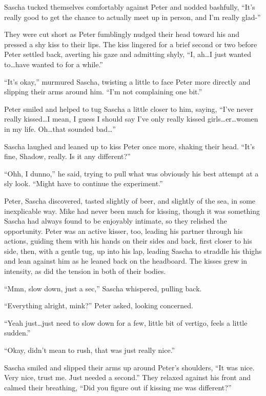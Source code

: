 \documentclass[12pt,letterpaper,oneside]{memoir}
\begin{document}
  Sascha tucked themselves comfortably against Peter and nodded bashfully, ``It's really good to get the chance to actually meet up in person, and I'm really glad-''

  They were cut short as Peter fumblingly nudged their head toward his and pressed a shy kiss to their lips. The kiss lingered for a brief second or two before Peter settled back, averting his gaze and admitting shyly, ``I, ah\ldots{}I just wanted to\ldots{}have wanted to for a while.''

  ``It's okay,'' murmured Sascha, twisting a little to face Peter more directly and slipping their arms around him. ``I'm not complaining one bit.''

  Peter smiled and helped to tug Sascha a little closer to him, saying, ``I've never really kissed\ldots{}I mean, I guess I should say I've only really kissed girls\ldots{}er\ldots{}women in my life. Oh\ldots{}that sounded bad\ldots{}''

  Sascha laughed and leaned up to kiss Peter once more, shaking their head. ``It's fine, Shadow, really. Is it any different?''

  ``Ohh, I dunno,'' he said, trying to pull what was obviously his best attempt at a sly look. ``Might have to continue the experiment.''

  Peter, Sascha discovered, tasted slightly of beer, and slightly of the sea, in some inexplicable way. Mike had never been much for kissing, though it was something Sascha had always found to be enjoyably intimate, so they relished the opportunity. Peter was an active kisser, too, leading his partner through his actions, guiding them with his hands on their sides and back, first closer to his side, then, with a gentle tug, up into his lap, leading Sascha to straddle his thighs and lean against him as he leaned back on the headboard. The kisses grew in intensity, as did the tension in both of their bodies.

  ``Mmn, slow down, just a sec,'' Sascha whispered, pulling back.

  ``Everything alright, mink?'' Peter asked, looking concerned.

  ``Yeah just\ldots{}just need to slow down for a few, little bit of vertigo, feels a little sudden.''

  ``Okay, didn't mean to rush, that was just really nice.''

  Sascha smiled and slipped their arms up around Peter's shoulders, ``It was nice. Very nice, trust me. Just needed a second.'' They relaxed against his front and calmed their breathing, ``Did you figure out if kissing me was different?''
\end{document}
